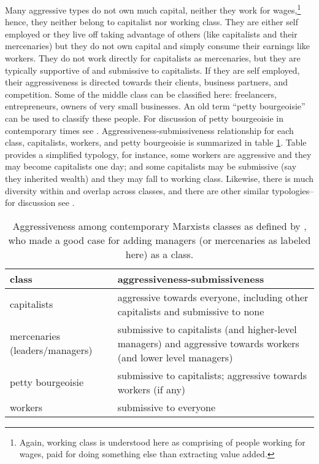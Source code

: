\documentclass[11pt, letterpaper]{article}
\begin{document}
\begin{spacing}{2.0}
Many aggressive types do not own much capital, neither they
work for wages,\footnote{Again,
working class is understood here as comprising of people working for wages, paid
for doing something else than extracting value added.}
hence, they neither belong to capitalist nor working class.  They are either
self employed or they live off
taking advantage of others (like capitalists and their mercenaries) but they do
not own capital and simply consume their earnings like workers. They do not work directly
for capitalists as mercenaries, but they are typically supportive of and
submissive to capitalists. If they are self employed, their aggressiveness is
directed towards their clients, business partners, and competition.
 Some of the middle class can be classified here: freelancers, entrepreneurs, owners of very small businesses. %
An old term ``petty bourgeoisie'' can be used to classify these people. 
For
discussion of petty bourgeoisie in contemporary times see \citet{steinmetz89}. 
 Aggressiveness-submissiveness relationship for each class, capitalists, workers,
 and petty bourgeoisie is summarized in table \ref{appAggClawright77}. 
 Table provides a simplified typology, for instance, some workers are aggressive and they may
  become capitalists one day; and some capitalists may be submissive (say they
  inherited wealth) and they may fall to working class. Likewise, there is much
  diversity within  and overlap across classes, and there are other similar
  typologies--for discussion see \citet{argyle94,wright77}. %
 

\begin{table}[H]\centering\footnotesize
\caption{Aggressiveness among contemporary Marxists
  classes as defined by \citet{wright77}, who made a good case for adding
  managers (or mercenaries as labeled here) as a class. 
}
\begin{tabular}{p{1.9in}p{5.3in}}\hline 
class&aggressiveness-submissiveness \\\hline
capitalists&aggressive towards everyone, including other capitalists and submissive to none\\
mercenaries (leaders/managers)& submissive to capitalists (and higher-level
managers) and aggressive towards workers (and lower level managers)\\
petty bourgeoisie & submissive to capitalists; aggressive towards workers (if any)\\
workers& submissive to everyone\\\hline
\end{tabular}\label{appAggClawright77}\end{table}



\end{spacing}
\end{document}
